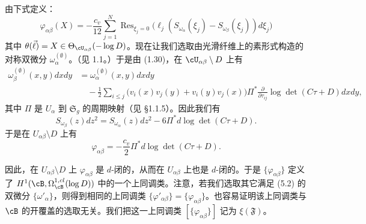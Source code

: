 由下式定义：
\begin{equation}
 \varphi_{\alpha\beta}(X)=-\frac{c_v}{12}\sum_{j=1}^{N}
 \operatorname{Res}_{\xi_j=0}\big(\ell_j(S_{\omega_\alpha}(\xi_j)
 -S_{\omega_\beta}(\xi_j))d\xi_j\big) \tag{5.17}
\end{equation}
其中 $\theta(\vec\ell)=X\in\Theta_{\cU_{\alpha\beta}}(-\log D)$。现在让我们选取由光滑纤维上的素形式构造的对称双微分 $\omega^{(\emptyset)}_\alpha$。（见 1.1。）于是由 (1.30)，在 $\cU_{\alpha\beta}\setminus D$ 上有
\begin{align*}
 \omega^{(\emptyset)}_\beta(x,y)dxdy&=\omega^{(\emptyset)}_\alpha(x,y)dxdy\\
 &\quad-\frac{1}{2}\sum_{i\le j}\big(v_i(x)v_j(y)+v_i(y)v_j(x)\big)
 \Pi^*\frac{\partial}{\partial\tau_{ij}}\log\det(C\tau+D)dxdy,
\end{align*}
其中 $\Pi$ 是 $U_\alpha$ 到 $\mathfrak S_g$ 的周期映射（见 §1.1.5）。因此我们有
\[
 S_{\omega_\beta}(z)dz^2=S_{\omega_\alpha}(z)dz^2
 -6\Pi^*d\log\det(C\tau+D).
\]
于是在 $U_{\alpha\beta}\setminus D$ 上有
\[
 \varphi_{\alpha\beta}=-\frac{c_v}{2}\Pi^*d\log\det(C\tau+D).
\]
{\emergencystretch=24.2pt 因此，在 $U_{\alpha\beta}\setminus D$ 上 $\varphi_{\alpha\beta}$ 是 $d$-闭的，从而在 $U_{\alpha\beta}$ 上也是 $d$-闭的。于是 $\{\varphi_{\alpha\beta}\}$ 定义了 $H^1(\cB,\Omega^{1,cl}_\cB(\log D))$ 中的一个上同调类。注意，若我们选取其它满足 (5.2) 的双微分 $\{\omega'_\alpha\}$，则得到相同的上同调类 $\{\varphi'_{\alpha\beta}\}=\{\varphi_{\alpha\beta}\}$。也容易证明该上同调类与 $\cB$ 的开覆盖的选取无关。我们把这一上同调类 $[\{\varphi_{\alpha\beta}\}]$ 记为 $\xi(\mathfrak F)$。\par}



